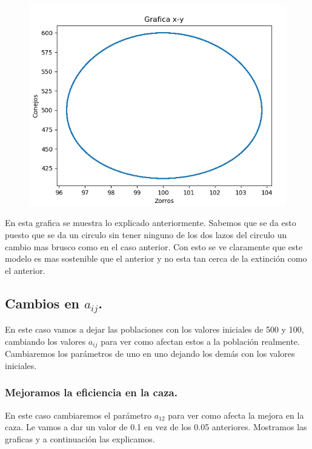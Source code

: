 \documentclass[]{article}
\begin{document}
\begin{figure}[H]
	\centering
	\includegraphics[width=1\linewidth]{screenshot006}

\end{figure}
En esta grafica se muestra lo explicado anteriormente. Sabemos que se da esto puesto que se da un circulo sin tener ninguno de los dos lazos del circulo un cambio mas brusco como en el caso anterior. Con esto se ve claramente que este modelo es mas sostenible que el anterior y no esta tan cerca de la extinción como el anterior.
\newpage
\subsection{Cambios en $a_{ij}$.}
En este caso vamos a dejar las poblaciones con los valores iniciales de 500 y 100, cambiando los valores $a_{ij}$ para ver como afectan estos a la población realmente. Cambiaremos los parámetros de uno en uno dejando los demás con los valores iniciales.
\subsubsection{Mejoramos la eficiencia en la caza.}
En este caso cambiaremos el parámetro $a_{12}$ para ver como afecta la mejora en la caza. Le vamos a dar un valor de 0.1 en vez de los 0.05 anteriores. Mostramos las graficas y a continuación las explicamos.
\end{document}
